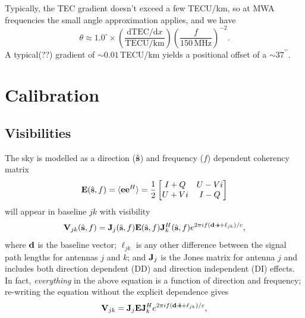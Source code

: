 \documentclass{book}
\newcommand{\shat}{\hat{\bf s}}
\begin{document}
Typically, the TEC gradient doesn't exceed a few TECU/km, so at MWA frequencies the small angle approximation applies, and we have
\begin{equation}
    \theta \approx 1.0^\circ \times \left(\frac{\text{dTEC}/\text{d}x}{\text{TECU/km}}\right) \left(\frac{f}{150\,\text{MHz}}\right)^{-2}.
\end{equation}
A typical(??) gradient of ${\sim}0.01\,$TECU/km yields a positional offset of a ${\sim}37^{\prime\prime}$.

\chapter{Calibration}

\section{Visibilities}

The sky is modelled as a direction ($\shat$) and frequency ($f$) dependent coherency matrix
\begin{equation}
    {\bf E}(\shat, f)
        = \langle{\bf e}{\bf e}^H\rangle
        = \frac12 \begin{bmatrix} I+Q & U-Vi \\ U+Vi & I-Q \end{bmatrix}
\end{equation}
will appear in baseline $jk$ with visibility
\begin{equation}
    {\bf V}_{jk}(\shat,f) = {\bf J}_j(\shat, f){\bf E}(\shat, f){\bf J}_k^H(\shat, f) e^{2\pi i f ({\bf d}\cdot\shat + \ell_{jk})/c},
\end{equation}
where ${\bf d}$ is the baseline vector; $\ell_{jk}$ is any other difference between the signal path lengths for antennas $j$ and $k$; and ${\bf J}_j$ is the Jones matrix for antenna $j$ and includes both direction dependent (DD) and direction independent (DI) effects.
In fact, \emph{everything} in the above equation is a function of direction and frequency; re-writing the equation without the explicit dependence gives
\begin{equation}
    {\bf V}_{jk} = {\bf J}_j{\bf E}{\bf J}_k^H e^{2\pi i f ({\bf d}\cdot\shat + \ell_{jk})/c},
\end{equation}
\end{document}
